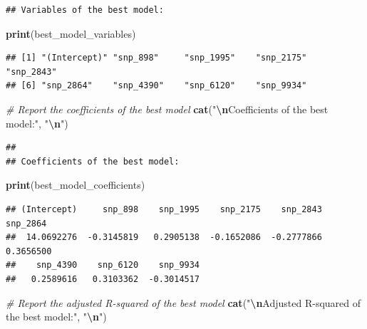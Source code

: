 \documentclass[
]{article}
\newenvironment{Shaded}{\begin{snugshade}}{\end{snugshade}}
\newcommand{\CommentTok}[1]{\textcolor[rgb]{0.56,0.35,0.01}{\textit{#1}}}
\newcommand{\FunctionTok}[1]{\textcolor[rgb]{0.13,0.29,0.53}{\textbf{#1}}}
\newcommand{\NormalTok}[1]{#1}
\newcommand{\SpecialCharTok}[1]{\textcolor[rgb]{0.81,0.36,0.00}{\textbf{#1}}}
\newcommand{\StringTok}[1]{\textcolor[rgb]{0.31,0.60,0.02}{#1}}
\begin{document}
\begin{verbatim}
## Variables of the best model:
\end{verbatim}

\begin{Shaded}
\begin{Highlighting}[]
\FunctionTok{print}\NormalTok{(best\_model\_variables)}
\end{Highlighting}
\end{Shaded}

\begin{verbatim}
## [1] "(Intercept)" "snp_898"     "snp_1995"    "snp_2175"    "snp_2843"   
## [6] "snp_2864"    "snp_4390"    "snp_6120"    "snp_9934"
\end{verbatim}

\begin{Shaded}
\begin{Highlighting}[]
\CommentTok{\# Report the coefficients of the best model}
\FunctionTok{cat}\NormalTok{(}\StringTok{"}\SpecialCharTok{\textbackslash{}n}\StringTok{Coefficients of the best model:"}\NormalTok{, }\StringTok{"}\SpecialCharTok{\textbackslash{}n}\StringTok{"}\NormalTok{)}
\end{Highlighting}
\end{Shaded}

\begin{verbatim}
## 
## Coefficients of the best model:
\end{verbatim}

\begin{Shaded}
\begin{Highlighting}[]
\FunctionTok{print}\NormalTok{(best\_model\_coefficients)}
\end{Highlighting}
\end{Shaded}

\begin{verbatim}
## (Intercept)     snp_898    snp_1995    snp_2175    snp_2843    snp_2864 
##  14.0692276  -0.3145819   0.2905138  -0.1652086  -0.2777866   0.3656500 
##    snp_4390    snp_6120    snp_9934 
##   0.2589616   0.3103362  -0.3014517
\end{verbatim}

\begin{Shaded}
\begin{Highlighting}[]
\CommentTok{\# Report the adjusted R{-}squared of the best model}
\FunctionTok{cat}\NormalTok{(}\StringTok{"}\SpecialCharTok{\textbackslash{}n}\StringTok{Adjusted R{-}squared of the best model:"}\NormalTok{, }\StringTok{"}\SpecialCharTok{\textbackslash{}n}\StringTok{"}\NormalTok{)}
\end{Highlighting}
\end{Shaded}
\end{document}
